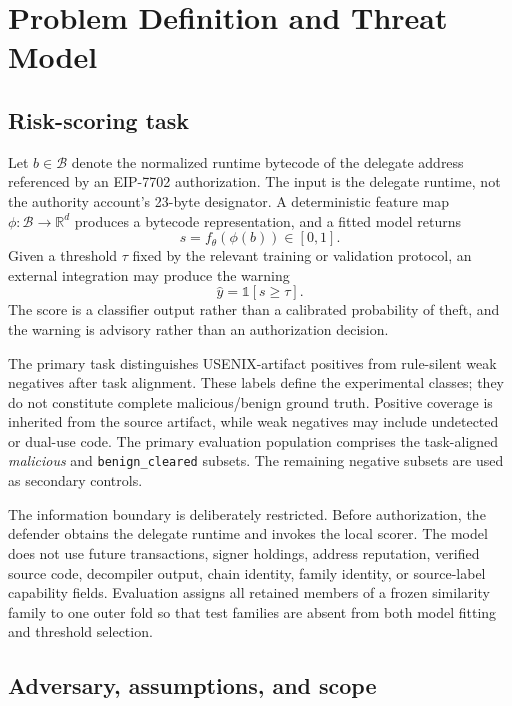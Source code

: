 \documentclass[conference]{IEEEtran}
\begin{document}
\section{Problem Definition and Threat Model}
\label{sec:problem_threat}

\subsection{Risk-scoring task}

Let $b\in\mathcal{B}$ denote the normalized runtime bytecode of the delegate address referenced by an EIP-7702 authorization. The input is the delegate runtime, not the authority account's 23-byte designator. A deterministic feature map $\phi:\mathcal{B}\rightarrow\mathbb{R}^{d}$ produces a bytecode representation, and a fitted model returns
\begin{equation}
s=f_{\theta}(\phi(b))\in[0,1].
\end{equation}
Given a threshold $\tau$ fixed by the relevant training or validation protocol, an external integration may produce the warning
\begin{equation}
\hat{y}=\mathbb{1}[s\geq\tau].
\end{equation}
The score is a classifier output rather than a calibrated probability of theft, and the warning is advisory rather than an authorization decision.

The primary task distinguishes USENIX-artifact positives from rule-silent weak negatives after task alignment. These labels define the experimental classes; they do not constitute complete malicious/benign ground truth. Positive coverage is inherited from the source artifact, while weak negatives may include undetected or dual-use code. The primary evaluation population comprises the task-aligned \emph{malicious} and \texttt{benign\_cleared} subsets. The remaining negative subsets are used as secondary controls.

The information boundary is deliberately restricted. Before authorization, the defender obtains the delegate runtime and invokes the local scorer. The model does not use future transactions, signer holdings, address reputation, verified source code, decompiler output, chain identity, family identity, or source-label capability fields. Evaluation assigns all retained members of a frozen similarity family to one outer fold so that test families are absent from both model fitting and threshold selection.

\subsection{Adversary, assumptions, and scope}
\end{document}
